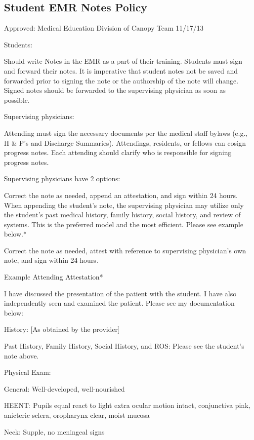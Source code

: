 \documentclass[
]{book}
\begin{document}
\hypertarget{student-emr-notes-policy}{%
\subsection{Student EMR Notes Policy}\label{student-emr-notes-policy}}

Approved: Medical Education Division of Canopy Team 11/17/13

Students:

Should write Notes in the EMR as a part of their training. Students must sign and forward their notes. It is imperative that student notes not be saved and forwarded prior to signing the note or the authorship of the note will change. Signed notes should be forwarded to the supervising physician as soon as possible.

Supervising physicians:

Attending must sign the necessary documents per the medical staff bylaws (e.g., H \& P's and Discharge Summaries). Attendings, residents, or fellows can cosign progress notes. Each attending should clarify who is responsible for signing progress notes.

Supervising physicians have 2 options:

Correct the note as needed, append an attestation, and sign within 24 hours. When appending the student's note, the supervising physician may utilize only the student's past medical history, family history, social history, and review of systems. This is the preferred model and the most efficient. Please see example below.*

Correct the note as needed, attest with reference to supervising physician's own note, and sign within 24 hours.

Example Attending Attestation*

I have discussed the presentation of the patient with the student. I have also independently seen and examined the patient. Please see my documentation below:

History: {[}As obtained by the provider{]}

Past History, Family History, Social History, and ROS: Please see the student's note above.

Physical Exam:

General: Well-developed, well-nourished

HEENT: Pupils equal react to light extra ocular motion intact, conjunctiva pink, anicteric sclera, oropharynx clear, moist mucosa

Neck: Supple, no meningeal signs
\end{document}
